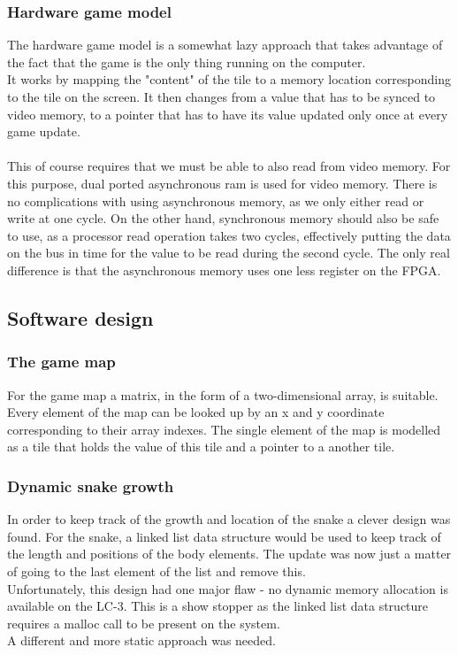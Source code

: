 \documentclass{acm_proc_article-sp}
\begin{document}
\subsubsection{Hardware game model}
The hardware game model is a somewhat lazy approach that takes advantage of the fact that the game is the only thing running on the computer.\\
It works by mapping the "content" of the tile to a memory location corresponding to the tile on the screen. It then changes from a value that has to be synced to video memory, to a pointer that has to have its value updated only once at every game update.\\\\
This of course requires that we must be able to also read from video memory. For this purpose, dual ported asynchronous ram\cite{chu2008fpga} is used for video memory. There is no complications with using asynchronous memory, as we only either read or write at one cycle. On the other hand, synchronous memory should also be safe to use, as a processor read operation takes two cycles, effectively putting the data on the bus in time for the value to be read during the second cycle. The only real difference is that the asynchronous memory uses one less register on the FPGA.

\subsection{Software design}
\subsubsection{The game map}
For the game map a matrix, in the form of a two-dimensional array, is suitable. Every element of the map can be looked up by an x and y coordinate corresponding to their array indexes. The single element of the map is modelled as a tile that holds the value of this tile and a pointer to a another tile.

\subsubsection{Dynamic snake growth}
In order to keep track of the growth and location of the snake a clever design was found. For the snake, a linked list data structure would be used to keep track of the length and positions of the body elements. The update was now just a matter of going to the last element of the list and remove this.\\
Unfortunately, this design had one major flaw - no dynamic memory allocation is available on the LC-3. This is a show stopper as the linked list data structure requires a malloc call to be present on the system.\\
A different and more static approach was needed.
\end{document}

